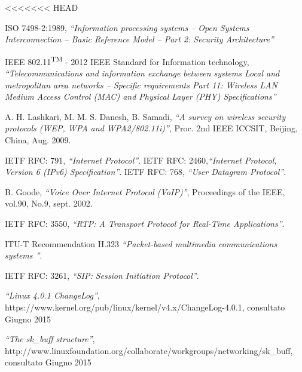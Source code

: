 <<<<<<< HEAD
\begin{thebibliography}{90}   
\rhead[\fancyplain{}{\bfseries \leftmark}]{\fancyplain{}{\bfseries
\thepage}}


 ISO 7498-2:1989, \textit{``Information processing systems -- Open Systems Interconnection -- Basic Reference Model -- Part 2: Security Architecture''}

 IEEE 802.11\textsuperscript{TM} - 2012 IEEE Standard for Information technology, \textit{``Telecommunications and information exchange between systems Local and metropolitan area networks -- Specific requirements Part 11: Wireless LAN Medium Access Control (MAC) and Physical Layer (PHY) Specifications''}

 A. H. Lashkari, M. M. S. Danesh, B. Samadi, \textit{``A survey on wireless security protocols (WEP, WPA and WPA2/802.11i)''}, Proc. 2nd IEEE ICCSIT, Beijing, China, Aug. 2009.

 IETF RFC: 791, \textit{``Internet Protocol''}.
 IETF RFC: 2460,\textit{``Internet Protocol, Version 6 (IPv6) Specification''}.
 IETF RFC: 768, \textit{``User Datagram Protocol''}.

 B. Goode, \textit{``Voice Over Internet Protocol (VoIP)''}, Proceedings of the IEEE, vol.90, No.9, sept. 2002.

 IETF RFC: 3550, \textit{``RTP: A Transport Protocol for Real-Time Applications''}.

 ITU-T Recommendation H.323 \textit{``Packet-based multimedia communications systems ''}.

 IETF RFC: 3261, \textit{``SIP: Session Initiation Protocol''}.


 \textit{``Linux 4.0.1 ChangeLog''}, https://www.kernel.org/pub/linux/kernel/v4.x/ChangeLog-4.0.1, consultato Giugno 2015

 \textit{``The sk\_buff structure''}, http://www.linuxfoundation.org/collaborate/workgroups/networking/sk\_buff, consultato Giugno 2015



\end{thebibliography}
